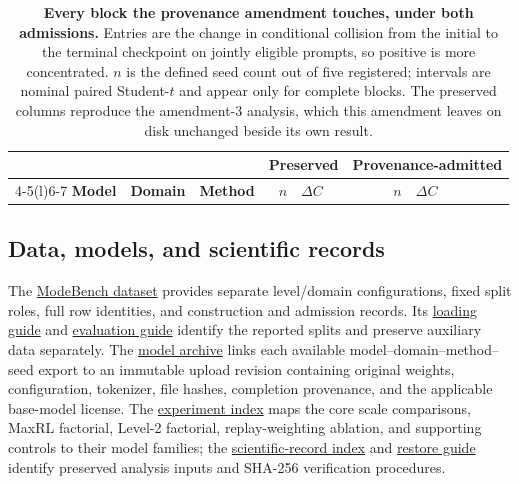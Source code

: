 \documentclass{article}
\newcommand{\1}{\mathbf 1}
\theoremstyle{remark}
\theoremstyle{definition}
\theoremstyle{plain}
\begin{document}
\begin{table}[H]
  \centering
  \caption{\textbf{Every block the provenance amendment touches, under both
  admissions.} Entries are the change in conditional collision from the initial
  to the terminal checkpoint on jointly eligible prompts, so positive is more
  concentrated. $n$ is the defined seed count out of five registered; intervals
  are nominal paired Student-$t$ and appear only for complete blocks. The
  preserved columns reproduce the amendment-3 analysis, which this amendment
  leaves on disk unchanged beside its own result.}
  \label{tab:initial-provenance}
  \small
  \setlength{\tabcolsep}{4pt}
  \begin{tabular}{@{}lll rl rl@{}}
    \toprule
    & & & \multicolumn{2}{c}{\textbf{Preserved}} & \multicolumn{2}{c}{\textbf{Provenance-admitted}} \\
    \cmidrule(lr){4-5}\cmidrule(l){6-7}
    \textbf{Model} & \textbf{Domain} & \textbf{Method} &
      $n$ & $\Delta C$ & $n$ & $\Delta C$ \\
    \midrule
    
  \end{tabular}
\end{table}

\subsection{Data, models, and scientific records}
\label{app:repro-artifacts}
\label{app:repro-code}
\label{app:archived-models}

The \href{https://huggingface.co/datasets/od2961/ModeBench}{ModeBench dataset}
provides separate level/domain configurations, fixed split roles, full row
identities, and construction and admission records. Its
\href{https://huggingface.co/datasets/od2961/ModeBench\#loading}{loading guide}
and \href{https://huggingface.co/datasets/od2961/ModeBench\#evaluation}{evaluation guide}
identify the reported splits and preserve auxiliary data separately.
The \href{https://huggingface.co/od2961/maxent-grpo-models}{model archive}
links each available model--domain--method--seed export to an immutable
upload revision containing original weights, configuration, tokenizer,
file hashes, completion provenance, and the applicable base-model license.
The \href{https://huggingface.co/od2961/maxent-grpo-models/blob/main/EXPERIMENTS.md}{experiment index}
maps the core scale comparisons, MaxRL factorial, Level-2 factorial,
replay-weighting ablation, and supporting controls to their model families;
the \href{https://huggingface.co/od2961/maxent-grpo-models/blob/main/DATA.md}{scientific-record index}
and \href{https://huggingface.co/od2961/maxent-grpo-models/blob/main/RESTORE.md}{restore guide}
identify preserved analysis inputs and SHA-256 verification procedures.
\end{document}
